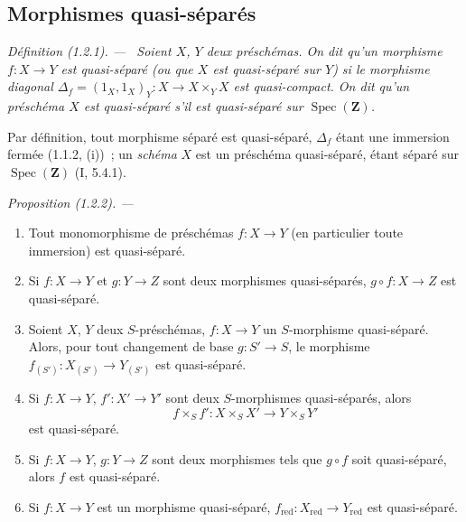 \documentclass[10pt,oneside]{book}
\makeatletter
\newcommand{\setmanualcurrentlabel}[1]{\def\@currentlabel{#1}}
\newenvironment{definition}[1][]{%
  \setmanualcurrentlabel{#1}\par\medskip\noindent\itshape Définition (#1). ---\ }{\par}
\newenvironment{proposition}[1][]{%
  \setmanualcurrentlabel{#1}\par\medskip\noindent\itshape Proposition (#1). ---\ }{\par}
\makeatother
\begin{document}
\subsection{Morphismes quasi-séparés}
\label{subsection:IV.1.2-fr}

\begin{definition}[1.2.1]
\label{IV.1.2.1-fr}
Soient $X$, $Y$ deux préschémas. On dit qu'un morphisme $f:X\to Y$ est
\emph{quasi-séparé} (ou que $X$ est \emph{quasi-séparé sur} $Y$) si le
morphisme diagonal
$\Delta_f=(1_X,1_X)_Y:X\to X\times_Y X$ est quasi-compact. On dit qu'un
préschéma $X$ est \emph{quasi-séparé} s'il est quasi-séparé sur
$\operatorname{Spec}(\mathbf Z)$.
\end{definition}

Par définition, tout morphisme séparé est quasi-séparé, $\Delta_f$ étant une
immersion fermée (1.1.2, (i))~; un \emph{schéma} $X$ est un préschéma
quasi-séparé, étant séparé sur $\operatorname{Spec}(\mathbf Z)$ (I, 5.4.1).

\begin{proposition}[1.2.2]
\label{IV.1.2.2-fr}
\begin{enumerate}
  \item[(i)] Tout monomorphisme de préschémas $f:X\to Y$ (en particulier toute
  immersion) est quasi-séparé.
  \item[(ii)] Si $f:X\to Y$ et $g:Y\to Z$ sont deux morphismes quasi-séparés,
  $g\circ f:X\to Z$ est quasi-séparé.
  \item[(iii)] Soient $X$, $Y$ deux $S$-préschémas, $f:X\to Y$ un $S$-morphisme
  quasi-séparé. Alors, pour tout changement de base $g:S'\to S$, le morphisme
  $f_{(S')}:X_{(S')}\to Y_{(S')}$ est quasi-séparé.
  \item[(iv)] Si $f:X\to Y$, $f':X'\to Y'$ sont deux $S$-morphismes quasi-séparés,
  alors
  \[
    f\times_S f':X\times_S X'\to Y\times_S Y'
  \]
  est quasi-séparé.
  \item[(v)] Si $f:X\to Y$, $g:Y\to Z$ sont deux morphismes tels que $g\circ f$
  soit quasi-séparé, alors $f$ est quasi-séparé.
  \item[(vi)] Si $f:X\to Y$ est un morphisme quasi-séparé,
  $f_{\mathrm{red}}:X_{\mathrm{red}}\to Y_{\mathrm{red}}$ est quasi-séparé.
\end{enumerate}
\end{proposition}
\end{document}
